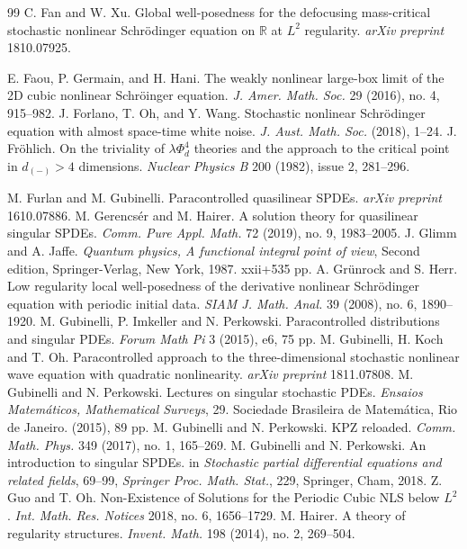 \documentclass[11 pt,reqno]{amsart}
\theoremstyle{definition}
\theoremstyle{remark}
\numberwithin{equation}{section}
\begin{document}
{{\begin{thebibliography}{99}
 C. Fan and W. Xu. Global well-posedness for the defocusing mass-critical stochastic nonlinear Schr\"{o}dinger equation on $\mathbb{R}$ at $L^ 2$ regularity. \emph{arXiv preprint} 1810.07925.
 
 
  E. Faou, P. Germain, and H. Hani. The weakly nonlinear large-box limit of the 2D cubic nonlinear Schr\"{o}inger equation. \emph{J. Amer. Math. Soc.} 29 (2016), no. 4, 915--982.
  J. Forlano, T. Oh, and Y. Wang. Stochastic nonlinear Schr\"{o}dinger equation with almost space-time white noise. \emph{J. Aust. Math. Soc.} (2018), 1--24.
  J. Fr\"{o}hlich. On the triviality of $\lambda\Phi_d^4$ theories and the approach to the critical point in $d_{(-)}>4$ dimensions. \emph{Nuclear Physics B} 200 (1982), issue 2, 281--296.
 
  M. Furlan and M. Gubinelli. Paracontrolled quasilinear SPDEs. \emph{arXiv preprint} 1610.07886.
  M. Gerencs\'{e}r and M. Hairer. A solution theory for quasilinear singular SPDEs. \emph{Comm. Pure Appl. Math.} 72 (2019), no. 9, 1983--2005.
  J. Glimm and A. Jaffe. {\em Quantum physics,  A functional integral point of view}, Second edition, Springer-Verlag, New York, 1987. xxii+535 pp.
  A. Gr\"{u}nrock and S. Herr. Low regularity local well-posedness of the derivative nonlinear Schr\"{o}dinger equation with periodic initial data. \emph{SIAM J. Math. Anal.} 39 (2008), no. 6, 1890--1920.
  M. Gubinelli, P. Imkeller and N. Perkowski. Paracontrolled distributions and singular PDEs. \emph{Forum Math Pi} 3 (2015), e6, 75 pp.
  M. Gubinelli, H. Koch and T. Oh. Paracontrolled approach to the three-dimensional stochastic nonlinear wave equation with quadratic nonlinearity. \emph{arXiv preprint} 1811.07808.
    M. Gubinelli and N. Perkowski. Lectures on singular stochastic PDEs. \emph{Ensaios Matem\'aticos, Mathematical Surveys}, 29. Sociedade Brasileira de Matem\'atica, Rio de Janeiro. (2015), 89 pp.
 M. Gubinelli and N. Perkowski. KPZ reloaded. \emph{Comm. Math. Phys.} 349 (2017), no. 1, 165--269.
 M. Gubinelli and N. Perkowski. An introduction to singular SPDEs. in \emph{Stochastic partial differential equations and related fields}, 69--99, \emph{Springer Proc. Math. Stat.},  229, Springer, Cham, 2018.
   Z. Guo and T. Oh. Non-Existence of Solutions for the Periodic Cubic NLS below $L^2$. \emph{Int. Math. Res. Notices} 2018, no. 6, 1656--1729.
 M. Hairer. A theory of regularity structures. \emph{Invent. Math.} 198 (2014), no. 2, 269--504.

\end{thebibliography}}}
\end{document}

